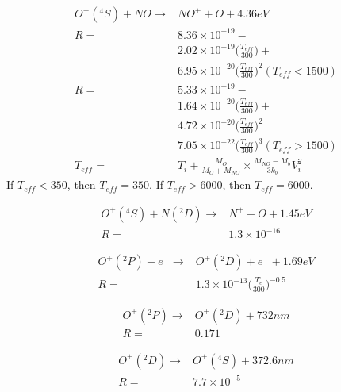 \documentclass[twoside,10pt]{book}
\begin{document}
\begin{equation}
\begin{split}
O^+(^4S) + NO \rightarrow &  NO^+ + O + 4.36 eV\\
R = & 8.36\times 10^{-19} - \\
    & 2.02\times 10^{-19} \bigg(\frac{T_{eff}}{300}\bigg) + \\
    & 6.95\times 10^{-20} \bigg(\frac{T_{eff}}{300}\bigg)^2 (T_{eff} < 1500)\\
R = & 5.33\times 10^{-19} - \\
    & 1.64\times 10^{-20} \bigg(\frac{T_{eff}}{300}\bigg) + \\
    & 4.72\times 10^{-20} \bigg(\frac{T_{eff}}{300}\bigg)^2 \\
    & 7.05\times 10^{-22} \bigg(\frac{T_{eff}}{300}\bigg)^3 (T_{eff} > 1500) \\ 
T_{eff} = & T_i + \frac{M_O}{M_O + M_{NO}}\times\frac{M_{NO} - M_b}{3k_b}V_i^2
\end{split}
\end{equation}
If $T_{eff} < 350$, then $T_{eff} = 350$.
If $T_{eff} > 6000$, then $T_{eff} = 6000$.

\begin{equation}
\begin{split}
O^+(^4S) + N(^2D) \rightarrow &  N^+ + O + 1.45 eV\\
R = & 1.3 \times 10^{-16}
\end{split}
\end{equation}

\begin{equation}
\begin{split}
O^+(^2P) +e^- \rightarrow &  O^+(^2D) + e^- + 1.69 eV\\
R = & 1.3 \times 10^{-13} \bigg(\frac{T_e}{300}\bigg)^{-0.5} %
\end{split}
\end{equation}

\begin{equation}
\begin{split}
O^+(^2P) \rightarrow &  O^+(^2D) + 732nm\\
R = & 0.171
\end{split}
\end{equation}

\begin{equation}
\begin{split}
O^+(^2D) \rightarrow &  O^+(^4S) + 372.6nm\\
R = & 7.7\times 10^{-5}
\end{split}
\end{equation}
\end{document}
